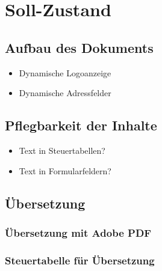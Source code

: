 \chapter{Soll-Zustand}

\section{Aufbau des Dokuments}
\begin{itemize}
	\item Dynamische Logoanzeige
	\item Dynamische Adressfelder
	
\end{itemize}

\section{Pflegbarkeit der Inhalte}
	\begin{itemize}
		\item Text in Steuertabellen?
		\item Text in Formularfeldern?
	\end{itemize}

\section{Übersetzung}

\subsection{Übersetzung mit Adobe PDF}

\subsection{Steuertabelle für Übersetzung}